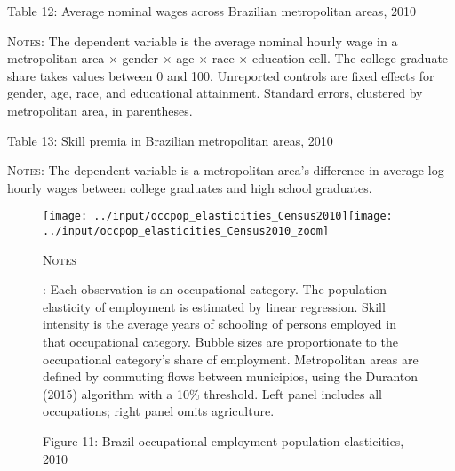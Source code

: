 \documentclass[11pt]{article}
\begin{document}
\begin{table}
\caption*{Table 12: Average nominal wages across Brazilian metropolitan areas, 2010}
\label{tab:urbanwagepremia:Brazil}
\begin{center}

\begin{minipage}{0.93\textwidth}
{\footnotesize
	\textsc{Notes}:
	The dependent variable is the average nominal hourly wage in a metropolitan-area $\times$ gender $\times$ age $\times$ race $\times$ education cell.
	The college graduate share takes values between 0 and 100.
	Unreported controls are fixed effects for gender, age, race, and educational attainment.
	Standard errors, clustered by metropolitan area, in parentheses.
}
\end{minipage}
\end{center}
\end{table}


\begin{table}
\caption*{Table 13: Skill premia in Brazilian metropolitan areas, 2010}
\label{tab:skillpremia:Brazil}
\begin{center}

\begin{minipage}{0.9\textwidth}
{\footnotesize
	\textsc{Notes}:
	The dependent variable is a metropolitan area's difference in average log hourly wages between college graduates and high school graduates.\par
}
\end{minipage}
\end{center}
\end{table}



\begin{figure}[hp]
\caption*{Figure 11: Brazil occupational employment population elasticities, 2010\label{fig:Brazil-occ-elasticities}}
\begin{centering}
\texttt{[image: ../input/occpop\_elasticities\_Census2010]}\texttt{[image: ../input/occpop\_elasticities\_Census2010\_zoom]}
\par\end{centering}
\centering{}%
\begin{minipage}[t]{0.85\textwidth}%
\textsc{\footnotesize{}Notes}{\footnotesize{}:
Each observation is an occupational category.
The population elasticity of employment is estimated by linear regression.
Skill intensity is the average years of schooling of persons employed in that occupational category.
Bubble sizes are proportionate to the occupational category's share of employment.
Metropolitan areas are defined by commuting flows between municipios, using the Duranton (2015) algorithm with a 10\% threshold.
Left panel includes all occupations; right panel omits agriculture.\par}%
\end{minipage}
\end{figure}
\end{document}
